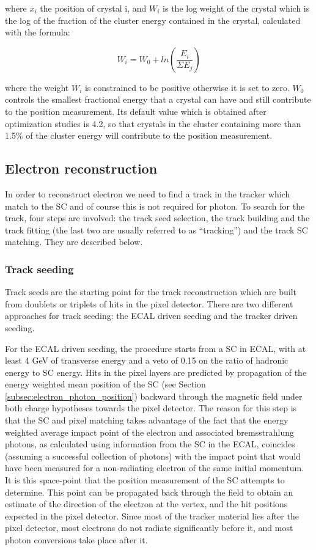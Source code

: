 where $x_{i}$ the position of crystal i, and $W_{i}$ is the log weight of the crystal which is the log of the fraction of the cluster energy contained in the crystal, calculated with the formula:

\begin{equation}
W_{i}=W_{0}+ln(\frac{E_{i}}{\Sigma E_{j}})
\label{eq:log_fraction}
\end{equation}

where the weight $W_{i}$ is constrained to be positive otherwise it is set to zero. $W_{0}$ controls the smallest fractional energy that a crystal can have and still contribute to the position measurement. Its default value which is obtained after optimization studies is 4.2, so that crystals in the cluster containing
more than 1.5\% of the cluster energy will contribute to the position measurement.

\subsection{Electron reconstruction}\label{subsec:electron_reco}
In order to reconstruct electron we need to find a track in the tracker which match to the SC and of course this is not required for photon. To search for the track, four steps are involved: the track seed selection, the track building and the track fitting (the last two are usually referred to as ``tracking'') and the track SC matching. They are described below.

\subsubsection{Track seeding}\label{subsec:track_seeding}
Track seeds are the starting point for the track reconstruction which are built from doublets or triplets of hits in the pixel detector. There are two
different approaches for track seeding: the ECAL driven seeding and the tracker driven seeding.

For the ECAL driven seeding, the procedure starts from a SC in ECAL, with at least 4 GeV of transverse energy and a veto of 0.15 on the ratio of hadronic energy to SC energy. Hits in the pixel layers are predicted by propagation of the energy weighted mean position of the SC (see Section \ref{subsec:electron_photon_position}) backward through the magnetic field under both charge hypotheses towards the pixel detector. The reason for this step is that the SC and pixel matching takes advantage of the fact that the energy weighted average impact point of the electron and associated bremsstrahlung photons, as calculated using information from the SC in the ECAL, coincides (assuming a successful collection of photons) with the impact point that would have been measured for a non-radiating electron of the same initial momentum. It is this space-point that the position measurement of the SC attempts to determine. This point can be propagated back through the field to obtain an estimate of the direction of the electron at the vertex, and the hit positions expected in the pixel detector. Since most of the tracker material lies after the pixel detector, most electrons do not radiate significantly before it, and most photon conversions take place after it.

